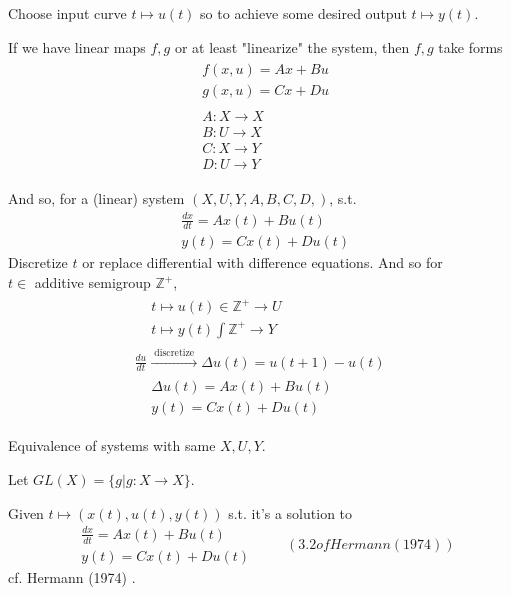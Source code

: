\documentclass[10pt]{amsart}
\begin{document}
\begin{multicols*}{2}
Choose input curve $t\mapsto u(t)$ so to achieve some desired output $t\mapsto y(t)$.  

If we have linear maps $f,g$ or at least "linearize" the system, then $f,g$ take forms 
\begin{equation}
\begin{gathered} 
\begin{aligned}
& f(x,u) = Ax+Bu \\ 
& g(x,u) = Cx+Du
\end{aligned}  \\
\begin{aligned}
	& A:X\to X \\ 
	& B: U\to X \\ 
	& C: X\to Y \\ 
	& D: U\to Y
\end{aligned}
\end{gathered}
\end{equation}

And so, for a (linear) system $(X,U,Y,A,B,C,D,)$, s.t. 
\[
\begin{aligned}
	& \frac{dx}{dt} = Ax(t) + Bu(t) \\ 
	& y(t) = Cx(t) + Du(t) 
\end{aligned}
\]
Discretize $t$ or replace differential with difference equations.  And so for  \\
$t\in $ additive semigroup $\mathbb{Z}^+$, 
\begin{equation}
\begin{gathered}
\begin{aligned}
	& t \mapsto u(t) \in \mathbb{Z}^+ \to U \\ 	
	& t \mapsto y(t) \int \mathbb{Z}^+ \to Y
\end{aligned} \\
	 \frac{du}{dt} \xrightarrow{ \text{ discretize } } \Delta u(t) = u(t+1) - u(t) \\
\begin{aligned}
	& \Delta u(t) = Ax(t) + Bu(t) \\ 
	& y(t) = Cx(t) + Du(t)
\end{aligned}
\end{gathered}
\end{equation}

Equivalence of systems with same $X,U,Y$.  

Let $GL(X) = \lbrace g | g:X \to X \rbrace$.  

Given $t \mapsto (x(t),u(t),y(t))$ s.t. it's a solution to 
\begin{equation}
\begin{aligned}
	& \frac{dx}{dt} = Ax(t) + Bu(t) \\ 
	& y(t) = Cx(t) + Du(t) 
\end{aligned} \qquad \, (3.2 of Hermann (1974))  
\end{equation}
cf. Hermann (1974) \cite{Herm1974}.  


\end{multicols*}
\end{document}
